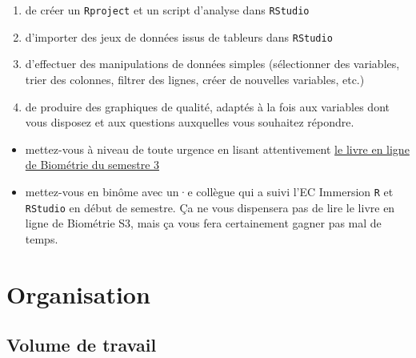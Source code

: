 \documentclass[
  a4paper,
  DIV=11,
  numbers=noendperiod,
  oneside]{scrreprt}
\providecommand{\tightlist}{%
  \setlength{\itemsep}{0pt}\setlength{\parskip}{0pt}}\usepackage{longtable,booktabs,array}
\begin{document}
\begin{enumerate}
\def\labelenumi{\arabic{enumi}.}
\tightlist
\item
  de créer un \texttt{Rproject} et un script d'analyse dans
  \texttt{RStudio}
\item
  d'importer des jeux de données issus de tableurs dans \texttt{RStudio}
\item
  d'effectuer des manipulations de données simples (sélectionner des
  variables, trier des colonnes, filtrer des lignes, créer de nouvelles
  variables, etc.)
\item
  de produire des graphiques de qualité, adaptés à la fois aux variables
  dont vous disposez et aux questions auxquelles vous souhaitez
  répondre.
\end{enumerate}

\begin{tcolorbox}[enhanced jigsaw, colbacktitle=quarto-callout-warning-color!10!white, opacityback=0, titlerule=0mm, leftrule=.75mm, bottomtitle=1mm, colframe=quarto-callout-warning-color-frame, title=\textcolor{quarto-callout-warning-color}{\faExclamationTriangle}\hspace{0.5em}{Si ces pré-requis ne sont pas maîtrisés}, bottomrule=.15mm, opacitybacktitle=0.6, colback=white, rightrule=.15mm, breakable, toptitle=1mm, arc=.35mm, toprule=.15mm, left=2mm, coltitle=black]

\begin{itemize}
\tightlist
\item
  mettez-vous à niveau de toute urgence en lisant attentivement
  \href{https://besibo.github.io/BiometrieS3/}{le livre en ligne de
  Biométrie du semestre 3}
\item
  mettez-vous en binôme avec un·e collègue qui a suivi l'EC Immersion
  \texttt{R} et \texttt{RStudio} en début de semestre. Ça ne vous
  dispensera pas de lire le livre en ligne de Biométrie S3, mais ça vous
  fera certainement gagner pas mal de temps.
\end{itemize}

\end{tcolorbox}

\hypertarget{organisation}{%
\section*{Organisation}\label{organisation}}

\hypertarget{volume-de-travail}{%
\subsection*{Volume de travail}\label{volume-de-travail}}
\end{document}

